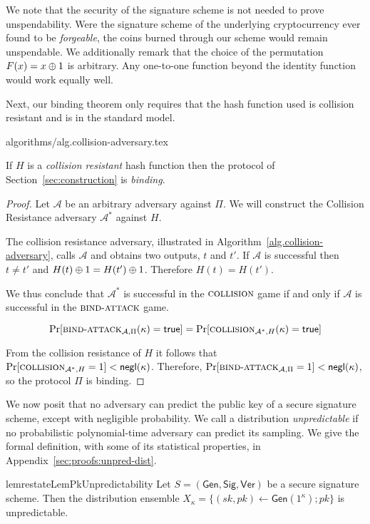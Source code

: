 We note that the security of the signature scheme is not needed to prove unspendability. Were the signature scheme of the underlying cryptocurrency ever found to be \emph{forgeable}, the coins burned through our scheme would remain unspendable. We additionally remark that the
choice of the permutation $F(x) = x \oplus 1$ is arbitrary. Any one-to-one
function beyond the identity function would work equally well.

Next, our binding theorem only requires that the hash function used is collision
resistant and is in the standard model.

{algorithms/alg.collision-adversary.tex}

\begin{theorem}[Binding]
  If $H$ is a \emph{collision resistant} hash function then the protocol of Section~\ref{sec:construction} is \emph{binding}.
\end{theorem}
\begin{proof}
  Let $\mathcal{A}$ be an arbitrary adversary against $\Pi$.
  We will construct the Collision Resistance adversary $\mathcal{A}^*$ against $H$.

  The collision resistance adversary, illustrated in Algorithm~\ref{alg.collision-adversary}, calls $\mathcal{A}$ and obtains two outputs, $t$ and $t'$. If $\mathcal{A}$ is successful then $t \neq t'$ and $H(t) \oplus 1 = H(t') \oplus 1$. Therefore $H(t) = H(t')$.

  We thus conclude that $\mathcal{A^*}$ is successful in the $\textsc{collision}$ game if and only if $\mathcal{A}$ is successful in the $\textsc{bind}\-\text{-}\-\textsc{attack}$ game.

  \[
    \Pr[\textsc{bind}\-\text{-}\-\textsc{attack}_{\mathcal{A},\Pi}(\kappa) = \mathsf{true}]
    =
    \Pr[\textsc{collision}_{\mathcal{A}^*,H}(\kappa) = \mathsf{true}]
  \]

  From the collision resistance of $H$ it follows that $\Pr[\textsc{collision}_{\mathcal{A}^*,H} = 1] < \textsf{negl}(\kappa)$. Therefore,
  $\Pr[\textsc{bind}\-\text{-}\-\textsc{attack}_{\mathcal{A},\Pi} = 1] < \textsf{negl}(\kappa)$, so
  the protocol $\Pi$ is binding.
\end{proof}

We now posit that no adversary can predict the public key of a secure signature scheme, except with negligible probability. We call a distribution \emph{unpredictable} if no
probabilistic polynomial-time adversary can predict its sampling. We give
the formal definition, with some of its statistical properties, in
Appendix~\ref{sec:proofs:unpred-dist}.

\begin{restatable}{lem}{restateLemPkUnpredictability}
  \label{lem:pk-unpredictability}
  Let $S = (\textsf{Gen}, \textsf{Sig}, \textsf{Ver})$ be a secure signature scheme.
  Then the distribution ensemble
  $X_\kappa = \{(sk, pk) \gets \textsf{Gen}(1^\kappa); pk\}$ is
  unpredictable.
\end{restatable}

